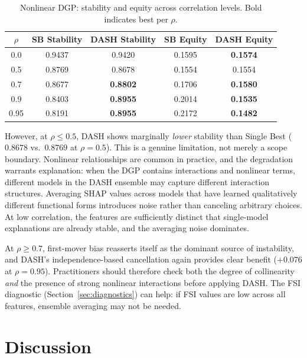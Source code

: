 \documentclass[11pt]{article}
\newcommand{\dash}{\textsc{DASH}}
\newcommand{\rhovar}{\rho}
\begin{document}
\begin{table}[h]
\centering
\caption{Nonlinear DGP: stability and equity across correlation levels.
Bold indicates best per $\rhovar$.}
\label{tab:nonlinear}
\begin{tabular}{ccccc}
\toprule
$\rhovar$ & SB Stability & \textbf{DASH Stability} & SB Equity & \textbf{DASH Equity} \\
\midrule
0.0  & 0.9437 & 0.9420 & 0.1595 & \textbf{0.1574} \\
0.5  & 0.8769 & 0.8678 & 0.1554 & 0.1554 \\
0.7  & 0.8677 & \textbf{0.8802} & 0.1706 & \textbf{0.1580} \\
0.9  & 0.8403 & \textbf{0.8955} & 0.2014 & \textbf{0.1535} \\
0.95 & 0.8191 & \textbf{0.8955} & 0.2172 & \textbf{0.1482} \\
\bottomrule
\end{tabular}
\end{table}

However, at $\rhovar \leq 0.5$, \dash{} shows marginally \emph{lower}
stability than Single Best ($0.8678$ vs.\ $0.8769$ at $\rhovar = 0.5$).
This is a genuine limitation, not merely a scope boundary.
Nonlinear relationships are common in practice, and the degradation
warrants explanation: when the DGP contains interactions and nonlinear
terms, different models in the DASH ensemble may capture different
interaction structures. Averaging SHAP values across models that have
learned qualitatively different functional forms introduces noise rather
than canceling arbitrary choices. At low correlation, the features are
sufficiently distinct that single-model explanations are already stable,
and the averaging noise dominates.

At $\rhovar \geq 0.7$, first-mover bias reasserts itself as the dominant
source of instability, and \dash{}'s independence-based cancellation
again provides clear benefit ($+0.076$ at $\rhovar = 0.95$).
Practitioners should therefore check both the degree of collinearity
\emph{and} the presence of strong nonlinear interactions before applying
\dash{}. The FSI diagnostic (Section~\ref{sec:diagnostics}) can help:
if FSI values are low across all features, ensemble averaging may not be
needed.


\section{Discussion}
\label{sec:discussion}
\end{document}
